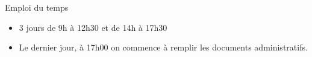 \begin{frame}{Emploi du temps}
  \begin{itemize}
  \item 3 jours de 9h à 12h30 et de 14h à 17h30
  \item Le dernier jour, à 17h00 on commence à remplir les documents administratifs.
  \end{itemize}
\end{frame}
